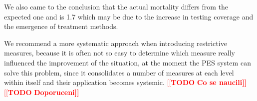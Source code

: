 \documentclass[12pt,a4paper,english]{article}
\newcommand{\todo}[1]{\noindent\textcolor{red}{[[\textbf{TODO} \textbf{#1]]}}\\}
\begin{document}
    We also came to the conclusion that the actual mortality differs from the expected one and is 1.7%
    which may be due to the increase in testing coverage and the emergence of treatment methods.

    We recommend a more systematic approach when introducing restrictive measures, 
    because it is often not so easy to determine which measure really influenced the improvement of the situation,
    at the moment the PES system can solve this problem, since it consolidates a number of measures at each level within itself and their application becomes systemic.
    \todo{Co se naucili}
    \todo{Doporuceni}    

    \clearpage
    \nocite{*}
	
	
\end{document}
